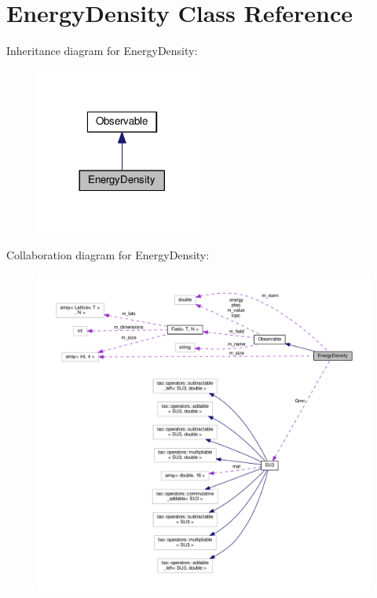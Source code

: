\hypertarget{classEnergyDensity}{}\section{Energy\+Density Class Reference}
\label{classEnergyDensity}


Inheritance diagram for Energy\+Density\+:\nopagebreak
\begin{figure}[H]
\begin{center}
\leavevmode
\includegraphics[width=161pt]{d2/d7e/classEnergyDensity__inherit__graph}
\end{center}
\end{figure}


Collaboration diagram for Energy\+Density\+:\nopagebreak
\begin{figure}[H]
\begin{center}
\leavevmode
\includegraphics[width=350pt]{d5/d62/classEnergyDensity__coll__graph}
\end{center}
\end{figure}
